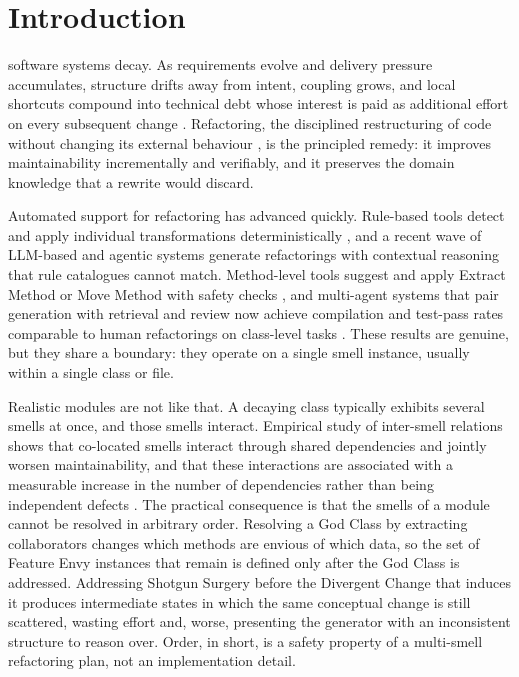 \documentclass[journal,onecolumn,11pt]{IEEEtran}
\begin{document}
\IEEEpeerreviewmaketitle

\section{Introduction}
 software systems decay. As requirements evolve and delivery pressure accumulates, structure drifts away from intent, coupling grows, and local shortcuts compound into technical debt whose interest is paid as additional effort on every subsequent change \cite{letouzey2012,tornhill2022,fowler2018}. Refactoring, the disciplined restructuring of code without changing its external behaviour \cite{fowler2018,opdyke1992}, is the principled remedy: it improves maintainability incrementally and verifiably, and it preserves the domain knowledge that a rewrite would discard.

Automated support for refactoring has advanced quickly. Rule-based tools detect and apply individual transformations deterministically \cite{tsantalis2011,tsantalis2022}, and a recent wave of LLM-based and agentic systems generate refactorings with contextual reasoning that rule catalogues cannot match. Method-level tools suggest and apply Extract Method or Move Method with safety checks \cite{pomian2024,wu2024}, and multi-agent systems that pair generation with retrieval and review now achieve compilation and test-pass rates comparable to human refactorings on class-level tasks \cite{xu2025mantra,oueslati2025}. These results are genuine, but they share a boundary: they operate on a single smell instance, usually within a single class or file.

Realistic modules are not like that. A decaying class typically exhibits several smells at once, and those smells interact. Empirical study of inter-smell relations shows that co-located smells interact through shared dependencies and jointly worsen maintainability, and that these interactions are associated with a measurable increase in the number of dependencies rather than being independent defects \cite{yamashita2013,palomba2015}. The practical consequence is that the smells of a module cannot be resolved in arbitrary order. Resolving a God Class by extracting collaborators changes which methods are envious of which data, so the set of Feature Envy instances that remain is defined only after the God Class is addressed. Addressing Shotgun Surgery before the Divergent Change that induces it produces intermediate states in which the same conceptual change is still scattered, wasting effort and, worse, presenting the generator with an inconsistent structure to reason over. Order, in short, is a safety property of a multi-smell refactoring plan, not an implementation detail.
\end{document}
